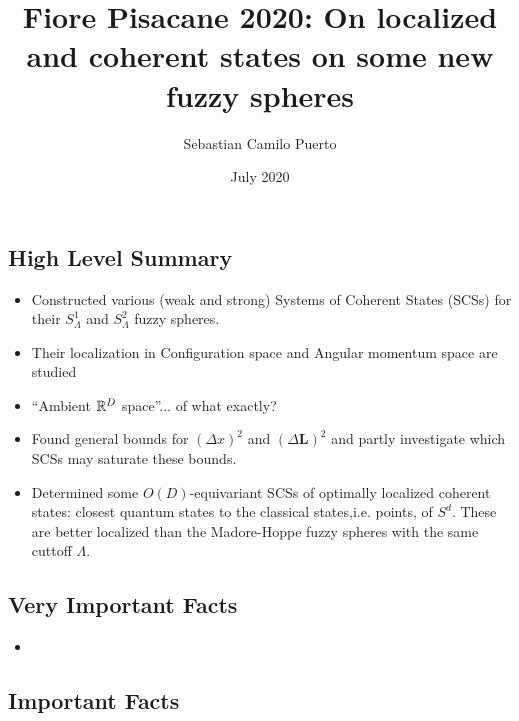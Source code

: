 \documentclass{article}
\title{Fiore Pisacane 2020: On localized and coherent states on some new fuzzy spheres}
\author{Sebastian Camilo Puerto}
\date{July 2020}
\begin{document}
\maketitle

\tableofcontents


\subsection{High Level Summary}

    \begin{itemize}

    \item Constructed various (weak and strong) Systems of Coherent States (SCSs) for their $S^1_\Lambda$ and $S^2_\Lambda$ fuzzy spheres.
    
    \item Their localization in Configuration space and Angular momentum space are studied
    
    \item ``Ambient $\mathbb{R}^D$ space''... of what exactly?
    
    \item Found general bounds for $(\Delta x)^2$ and $(\Delta \mathbf{L})^2$ and partly investigate which SCSs may saturate these bounds.
    
    \item Determined some $O(D)$-equivariant SCSs of optimally localized coherent states: closest quantum states to the classical states,i.e. points, of $S^d$. These are better localized than the Madore-Hoppe fuzzy spheres with the same cuttoff $\Lambda$.
    
    \end{itemize}

\subsection{Very Important Facts}

    \begin{itemize}

    \item 
    
    \end{itemize}

\subsection{Important Facts}
\end{document}

